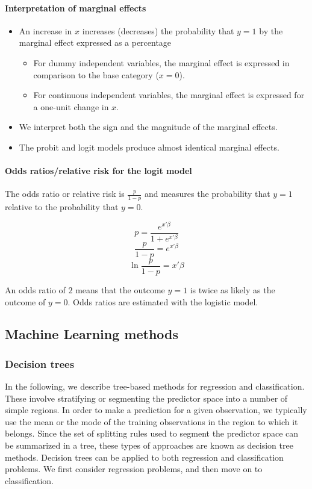 \paragraph{Interpretation of marginal effects}
\begin{itemize}
    \item An increase in $x$ increases (decreases) the probability that $y=1$ by the marginal effect
expressed as a percentage
    \begin{itemize}
        \item For dummy independent variables, the marginal effect is expressed in comparison to the
    base category ($x=0$).
        \item For continuous independent variables, the marginal effect is expressed for a one-unit
    change in $x$.
    \end{itemize}
    \item We interpret both the sign and the magnitude of the marginal effects.
    \item The probit and logit models produce almost identical marginal effects.

\end{itemize}

\paragraph{Odds ratios/relative risk for the logit model}
The odds ratio or relative risk is $\frac{p}{1-p}$ and measures the probability that $y=1$ relative
to the probability that $y=0$.

$$p = \frac{e^{x'\beta}}{1+e^{x'\beta}}$$
$$\frac{p}{1-p} = e^{x'\beta}$$
$$\ln \frac{p}{1-p} = x'\beta$$

An odds ratio of $2$ means that the outcome $y=1$ is twice as likely as the outcome of $y=0$. Odds
ratios are estimated with the logistic model.


\subsection{Machine Learning methods}
\subsubsection{Decision trees}

In the following, we describe tree-based methods for regression and classification. These involve
stratifying or segmenting the predictor space into a number of simple regions. In order to make a
prediction for a given observation, we typically use the mean or the mode of the training
observations in the region to which it belongs. Since the set of splitting rules used to segment the
predictor space can be summarized in a tree, these types of approaches are known as decision tree
methods. Decision trees can be applied to both regression and classification problems. We first
consider regression problems, and then move on to classification.

